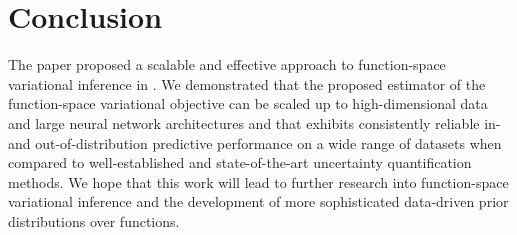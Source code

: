 %

\vspace*{-3pt}
\section{Conclusion}
\label{sec:conclusion}
\vspace*{-3pt}

The paper proposed a scalable and effective approach to function-space variational inference in \bnns.
We demonstrated that the proposed estimator of the function-space variational objective can be scaled up to high-dimensional data and large neural network architectures and that \fsvi exhibits consistently reliable in- and out-of-distribution predictive performance on a wide range of datasets when compared to well-established and state-of-the-art uncertainty quantification methods.
%
We hope that this work will lead to further research into function-space variational inference and the development of more sophisticated data-driven prior distributions over functions.


%